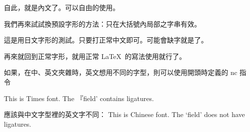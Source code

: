 \documentclass[12pt]{article}
\newcommand{\nc}[1]{{\rmfont #1}}
\begin{document}
自此，就是內文了。可以自由的使用。

我們再來試試換預設字形的方法：只在大括號內局部之字串有效。

{
這是用日文字形的測試。只要打正常中文即可。可能會缺字就是了。
}

再來就回到正常字形，就用正常 \LaTeX\ 的寫法使用就行了。

如果，在中、英文夾雜時，英文想用不同的字型，則可以使用開頭時定義的 nc 指令

\nc{This is Times font.  The 『field' contains ligatures.} 

應該與中文字型裡的英文字不同：
This is Chinese font. The `field' does not have ligatures.
\end{document}
